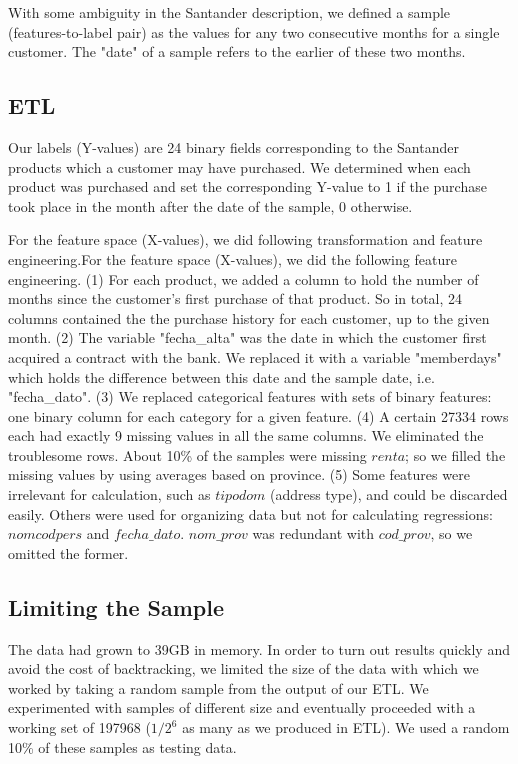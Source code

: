 \documentclass{article}
\begin{document}
\begin{spacing}{1}
\begin{large}
With some ambiguity in the Santander description, we defined a sample (features-to-label pair) as the values for any two consecutive months for a single customer. The "date" of a sample refers to the earlier of these two months.

\subsection{ETL}

Our labels (Y-values) are 24 binary fields corresponding to the Santander products which a customer may have purchased. We determined when each product was purchased and set the corresponding Y-value to 1 if the purchase took place in the month after the date of the sample, 0 otherwise.

For the feature space (X-values), we did following transformation and feature engineering.For the feature space (X-values), we did the following feature engineering. (1) For each product, we added a column to hold the number of months since the customer’s first purchase of that product. So in total, 24 columns contained the the purchase history for each customer, up to the given month. (2) The variable "fecha\_alta" was the date in which the customer first acquired a contract with the bank. We replaced it with a variable "memberdays" which holds the difference between this date and the sample date, i.e. "fecha\_dato". (3) We replaced categorical features with sets of binary features: one binary column for each category for a given feature. (4) A certain 27334 rows each had exactly 9 missing values in all the same columns. We eliminated the troublesome rows. About 10\% of the samples were missing $renta$; so we filled the missing values by using averages based on province. (5) Some features were irrelevant for calculation, such as $tipodom$ (address type), and could be discarded easily. Others were used for organizing data but not for calculating regressions: $nomcodpers$ and $fecha\_dato$. $nom\_prov$ was redundant with $cod\_prov$, so we omitted the former.
 
\subsection{Limiting the Sample}

The data had grown to 39GB in memory. In order to turn out results quickly and avoid the cost of backtracking, we limited the size of the data with which we worked by taking a random sample from the output of our ETL. We experimented with samples of different size and eventually proceeded with a working set of 197968 ($1/2^6$ as many as we produced in ETL). We used a random 10\% of these samples as testing data.


\end{large}
\end{spacing}
\end{document}
